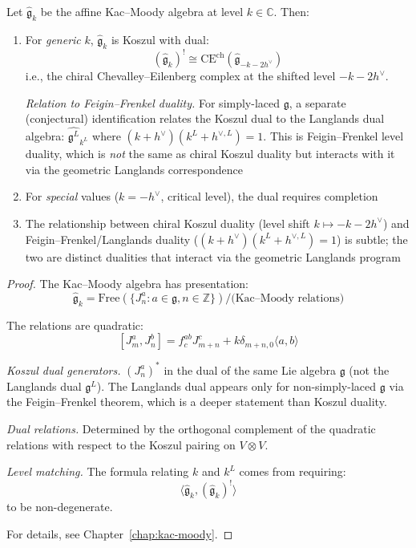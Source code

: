 \begin{proposition}\label{prop:kac-moody-koszul-duals}
Let $\widehat{\mathfrak{g}}_k$ be the affine Kac--Moody algebra at level $k \in \mathbb{C}$. 
Then:
\begin{enumerate}
\item For \emph{generic} $k$, $\widehat{\mathfrak{g}}_k$ is Koszul with dual:
      \[(\widehat{\mathfrak{g}}_k)^! \cong \mathrm{CE}^{\mathrm{ch}}(\widehat{\mathfrak{g}}_{-k - 2h^\vee})\]
      i.e., the chiral Chevalley--Eilenberg complex at the shifted level $-k - 2h^\vee$.

      \emph{Relation to Feigin--Frenkel duality.} For simply-laced $\mathfrak{g}$,
      a separate (conjectural) identification relates the Koszul dual to the Langlands dual algebra:
      $\widehat{\mathfrak{g}^L}_{k^L}$ where $(k + h^\vee)(k^L + h^{\vee,L}) = 1$.
      This is Feigin--Frenkel level duality, which is \emph{not} the same as chiral Koszul duality but interacts with it via the geometric Langlands correspondence
      
\item For \emph{special} values ($k = -h^\vee$, critical level), the dual requires 
      completion
      
\item The relationship between chiral Koszul duality (level shift $k \mapsto -k - 2h^\vee$) and Feigin--Frenkel/Langlands duality ($(k+h^\vee)(k^L + h^{\vee,L}) = 1$) is subtle; the two are distinct dualities that interact via the geometric Langlands program
\end{enumerate}
\end{proposition}

\begin{proof}
The Kac--Moody algebra has presentation:
\[\widehat{\mathfrak{g}}_k = \text{Free}(\{J^a_n : a \in \mathfrak{g}, n \in \mathbb{Z}\}) 
/ \text{(Kac--Moody relations)}\]

The relations are quadratic:
\[[J^a_m, J^b_n] = f^{ab}_c J^c_{m+n} + k \delta_{m+n,0} \langle a, b \rangle\]

\emph{Koszul dual generators.} $(J^a_n)^*$ in the dual of the same Lie algebra $\mathfrak{g}$ (not the Langlands dual $\mathfrak{g}^L$).  The Langlands dual appears only for non-simply-laced $\mathfrak{g}$ via the Feigin--Frenkel theorem, which is a deeper statement than Koszul duality.

\emph{Dual relations.} Determined by the orthogonal complement of the quadratic relations with respect to the Koszul pairing on $V \otimes V$.

\emph{Level matching.} The formula relating $k$ and $k^L$ comes from requiring:
\[\langle \widehat{\mathfrak{g}}_k, (\widehat{\mathfrak{g}}_k)^! \rangle\]
to be non-degenerate.

For details, see Chapter~\ref{chap:kac-moody}.
\end{proof}

